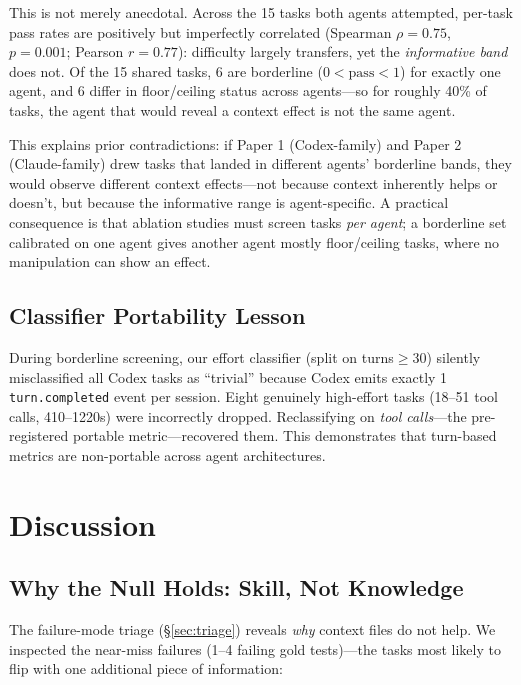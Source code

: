 \documentclass[11pt]{article}
\begin{document}
This is not merely anecdotal. Across the 15 tasks both agents attempted, per-task pass rates are positively but imperfectly correlated (Spearman $\rho{=}0.75$, $p{=}0.001$; Pearson $r{=}0.77$): difficulty largely transfers, yet the \emph{informative band} does not.
Of the 15 shared tasks, 6 are borderline ($0{<}\text{pass}{<}1$) for exactly one agent, and 6 differ in floor/ceiling status across agents---so for roughly 40\% of tasks, the agent that would reveal a context effect is not the same agent.

This explains prior contradictions: if Paper 1 (Codex-family) and Paper 2 (Claude-family) drew tasks that landed in different agents' borderline bands, they would observe different context effects---not because context inherently helps or doesn't, but because the informative range is agent-specific.
A practical consequence is that ablation studies must screen tasks \emph{per agent}; a borderline set calibrated on one agent gives another agent mostly floor/ceiling tasks, where no manipulation can show an effect.

\subsection{Classifier Portability Lesson}
\label{sec:classifier}

During borderline screening, our effort classifier (split on turns${\geq}$30) silently misclassified all Codex tasks as ``trivial'' because Codex emits exactly 1 \texttt{turn.completed} event per session.
Eight genuinely high-effort tasks (18--51 tool calls, 410--1220s) were incorrectly dropped.
Reclassifying on \emph{tool calls}---the pre-registered portable metric---recovered them.
This demonstrates that turn-based metrics are non-portable across agent architectures.

\section{Discussion}

\subsection{Why the Null Holds: Skill, Not Knowledge}

The failure-mode triage (\S\ref{sec:triage}) reveals \emph{why} context files do not help.
We inspected the near-miss failures (1--4 failing gold tests)---the tasks most likely to flip with one additional piece of information:
\end{document}
